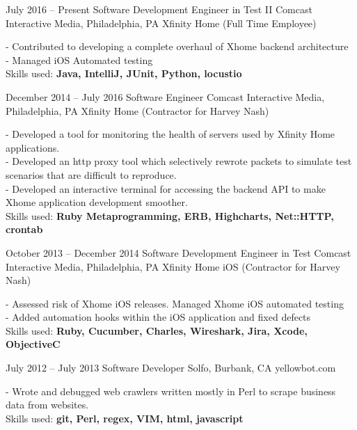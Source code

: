 \documentclass[oldfontcommands]{tccv}
\begin{document}
\begin{eventlist}

\item{July 2016 -- Present}
     {Software Development Engineer in Test II}
     {Comcast Interactive Media, Philadelphia, PA}
     {Xfinity Home (Full Time Employee)}

- Contributed to developing a complete overhaul of Xhome backend architecture \\
- Managed iOS Automated testing \\
Skills used: \textbf{Java, IntelliJ, JUnit, Python, locustio}

\item{December 2014 -- July 2016}
     {Software Engineer}
     {Comcast Interactive Media, Philadelphia, PA}
     {Xfinity Home (Contractor for Harvey Nash)}

- Developed a tool for monitoring the health of servers used by Xfinity Home applications. \\
- Developed an http proxy tool which selectively rewrote packets to simulate test scenarios that are difficult to reproduce. \\
- Developed an interactive terminal for accessing the backend API to make Xhome application development smoother. \\
Skills used: \textbf{Ruby Metaprogramming, ERB, Highcharts, Net::HTTP, crontab}

\item{October 2013 -- December 2014}
     {Software Development Engineer in Test}
     {Comcast Interactive Media, Philadelphia, PA}
     {Xfinity Home iOS (Contractor for Harvey Nash)}

- Assessed risk of Xhome iOS releases. Managed Xhome iOS automated testing \\
- Added automation hooks within the iOS application and fixed defects \\
Skills used: \textbf{Ruby, Cucumber, Charles, Wireshark, Jira, Xcode, ObjectiveC}

\item{July 2012 -- July 2013}
     {Software Developer}
     {Solfo, Burbank, CA}
     {yellowbot.com}

- Wrote and debugged web crawlers written mostly in Perl to scrape business data from websites. \\
Skills used: \textbf{git, Perl, regex, VIM, html, javascript}

\end{eventlist}
\end{document}
